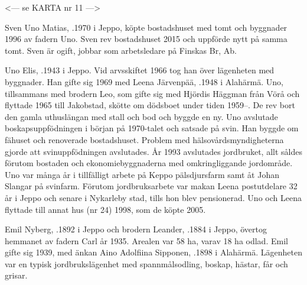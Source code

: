 <--- se KARTA nr 11 --->






Sven Uno Matias, .1970 i Jeppo, köpte bostadshuset med tomt och byggnader 1996 av fadern Uno. Sven rev bostadshuset 2015 och uppförde nytt på samma tomt. Sven är ogift, jobbar som arbetsledare på Finskas Br, Ab.\jhvspace{}



Uno Elis, .1943 i Jeppo. Vid arvsskiftet 1966 tog han över lägenheten med byggnader. Han gifte sig 1969 med Leena Järvenpää, .1948 i Alahärmä. Uno, tillsammans med brodern Leo, som gifte sig med Hjördis Häggman från Vörå och flyttade 1965 till Jakobstad, skötte om  dödsboet under tiden 1959--. De rev bort den gamla uthuslängan med stall och bod och byggde en ny. Uno avslutade boskapsuppfödningen i början på 1970-talet och satsade på svin. Han byggde om fähuset och renoverade bostadshuset. Problem med hälsovårdsmyndigheterna gjorde att svinuppfödningen avslutades. År 1993 avslutades jordbruket, allt såldes förutom bostaden och ekonomiebyggnaderna med omkringliggande jordområde. Uno var många år i tillfälligt arbete på Keppo pälsdjursfarm samt åt Johan Slangar på svinfarm. Förutom jordbruksarbete var makan Leena postutdelare 32 år i Jeppo och senare i Nykarleby stad, tills hon blev pensionerad. Uno och Leena flyttade till annat hus (nr 24) 1998, som de köpte 2005.
\begin{jhchildren}
  \item {}
  \item {}
  \item {}
\end{jhchildren}



Emil Nyberg, .1892 i Jeppo och brodern Leander, .1884 i Jeppo, övertog hemmanet av fadern Carl år 1935. Arealen var 58 ha, varav 18 ha odlad. Emil gifte sig 1939, med änkan Aino Adolfiina Sipponen, .1898 i Alahärmä. Lägenheten var en typisk jordbrukslägenhet med spannmålsodling, boskap, hästar, får och grisar.
\begin{jhchildren}
  \item {}
  \item {}
\end{jhchildren}

